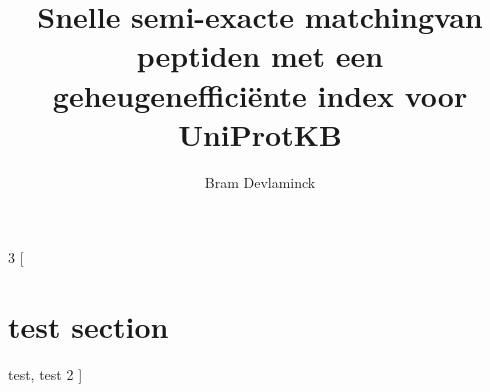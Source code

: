 \documentclass[11pt]{article}
\author{Bram Devlaminck}
\title{Snelle semi-exacte matching\newline van peptiden met een geheugenefficiënte index voor UniProtKB}
\date{}
\begin{document}
    \maketitle

    \begin{multicols}{3}
    [
        \section{test section}\label{sec:test-section}
        test, test 2
    ]
    \end{multicols}
\end{document}
